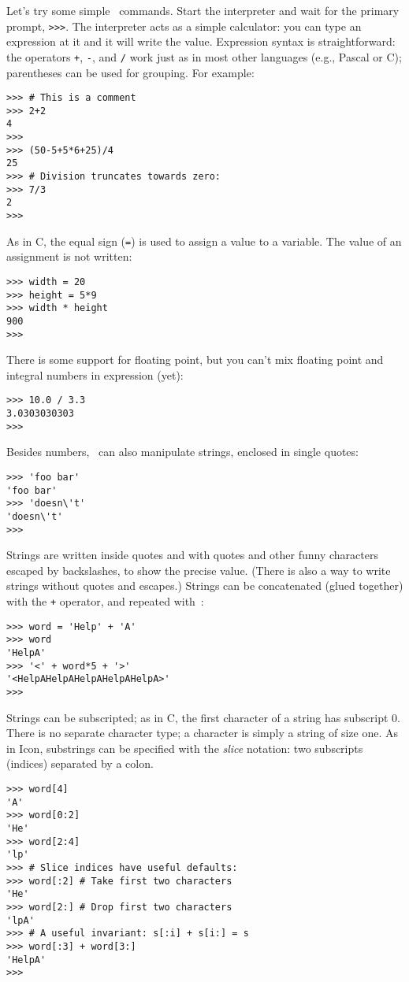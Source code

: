 Let's try some simple \Python\ commands.
Start the interpreter and wait for the primary prompt,
{\tt >>>}.
The interpreter acts as a simple calculator: you can type an expression
at it and it will write the value.
Expression syntax is straightforward: the operators
{\tt +},
{\tt -},
{\tt *}
and
{\tt /}
work just as in most other languages (e.g., Pascal or C); parentheses
can be used for grouping.
For example:
\bcode\begin{verbatim}
>>> # This is a comment
>>> 2+2
4
>>>
>>> (50-5+5*6+25)/4
25
>>> # Division truncates towards zero:
>>> 7/3
2
>>>
\end{verbatim}\ecode
As in C, the equal sign ({\tt =}) is used to assign a value to a variable.
The value of an assignment is not written:
\bcode\begin{verbatim}
>>> width = 20
>>> height = 5*9
>>> width * height
900
>>>
\end{verbatim}\ecode
There is some support for floating point, but you can't mix floating
point and integral numbers in expression (yet):
\bcode\begin{verbatim}
>>> 10.0 / 3.3
3.0303030303
>>>
\end{verbatim}\ecode
Besides numbers, \Python\ can also manipulate strings, enclosed in single
quotes:
\bcode\begin{verbatim}
>>> 'foo bar'
'foo bar'
>>> 'doesn\'t'
'doesn\'t'
>>>
\end{verbatim}\ecode
Strings are written inside quotes and with quotes and other funny
characters escaped by backslashes, to show the precise value.
(There is also a way to write strings without quotes and escapes.)
Strings can be concatenated (glued together) with the
{\tt +}
operator, and repeated with~{\tt *}:
\bcode\begin{verbatim}
>>> word = 'Help' + 'A'
>>> word
'HelpA'
>>> '<' + word*5 + '>'
'<HelpAHelpAHelpAHelpAHelpA>'
>>>
\end{verbatim}\ecode
Strings can be subscripted; as in C, the first character of a string has
subscript 0.
There is no separate character type; a character is simply a string of
size one.
As in Icon, substrings can be specified with the
{\em slice}
notation: two subscripts (indices) separated by a colon.
\bcode\begin{verbatim}
>>> word[4]
'A'
>>> word[0:2]
'He'
>>> word[2:4]
'lp'
>>> # Slice indices have useful defaults:
>>> word[:2] # Take first two characters
'He'
>>> word[2:] # Drop first two characters
'lpA'
>>> # A useful invariant: s[:i] + s[i:] = s
>>> word[:3] + word[3:]
'HelpA'
>>>
\end{verbatim}\ecode
